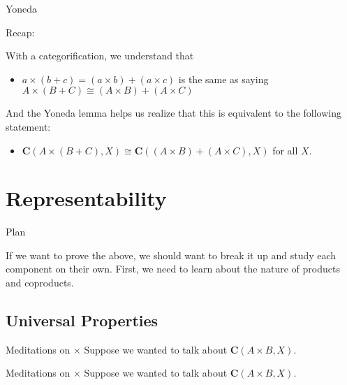 \documentclass[tikz]{beamer}
\theoremstyle{definition}
\begin{document}
\begin{frame}{Yoneda}

Recap:

\begin{block}{}
    With a categorification, we understand that 
    \begin{itemize}
        \item $a \times (b + c) = (a \times b) + (a \times c)$ is the same as saying $A \times (B + C) \cong (A \times B) + (A \times C)$
    \end{itemize}{}
\end{block}{}

\begin{block}{}
    And the Yoneda lemma helps us realize that this is equivalent to the following statement:
    
    \begin{itemize}
        \item $\mathbf{C}(A \times (B + C), X) \cong \mathbf{C}((A \times B) + (A \times C), X)$ for all $X$.
    \end{itemize}{}
\end{block}{}
    
\end{frame}

\section{Representability}

\begin{frame}{Plan}
    
    If we want to prove the above, we should want to break it up and study each component on their own. First, we need to learn about the nature of products and coproducts.
    
\end{frame}
\subsection{Universal Properties}

\begin{frame}{Meditations on $\times$}
    Suppose we wanted to talk about $\mathbf{C}(A \times B, X)$. 
\end{frame}{}

\begin{frame}{Meditations on $\times$}
    Suppose we wanted to talk about $\mathbf{C}(A \times B, X)$. 
\end{frame}{}
\end{document}
